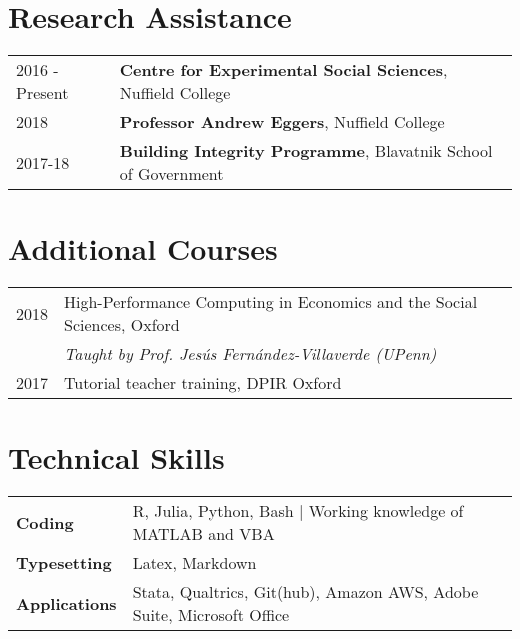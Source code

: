 \documentclass[11pt, a4paper]{article}
\begin{document}
  \section*{Research Assistance}
  \begin{tabular}{ll}
    2016 - Present & \textbf{Centre for Experimental Social Sciences}, Nuffield College \\
    2018 & \textbf{Professor Andrew Eggers}, Nuffield College \\
    2017-18 & \textbf{Building Integrity Programme}, Blavatnik School of Government \\
 \end{tabular}

 \section*{Additional Courses}
 \begin{tabular}{ll}
     2018 & High-Performance Computing in Economics and the Social Sciences, Oxford\\
          & \textit{Taught by Prof. Jesús Fernández-Villaverde (UPenn)} \\
     2017 & Tutorial teacher training, DPIR Oxford\\
\end{tabular}

 \section*{Technical Skills}
 \begin{tabular}{ll}
     \textbf{Coding} & R, Julia, Python, Bash $|$ Working knowledge of MATLAB and VBA \\
     \textbf{Typesetting} & Latex, Markdown \\
     \textbf{Applications} & Stata, Qualtrics, Git(hub), Amazon AWS, Adobe Suite, Microsoft Office
 \end{tabular}
\end{document}
